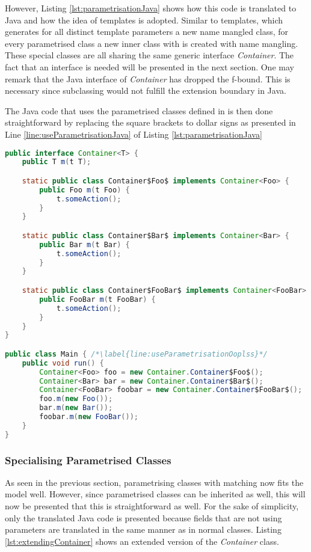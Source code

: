 However, Listing \ref{lst:parametrisationJava} shows
how this code is translated to Java and how the idea of templates is
adopted. Similar to \cpp templates, which generates for all distinct
template parameters a new name mangled class, for every parametrised
class a new inner class with is created with name mangling.
These special classes are all sharing the same generic
interface \emph{Container}. The fact that an interface is needed will be
presented in the next section. One may remark that the Java interface
of \emph{Container} has dropped the f-bound. This is necessary since
subclassing would not fulfill the extension boundary in Java.

The Java code that uses the parametrised classes defined in \ooplss is
then done straightforward by replacing the square brackets to dollar
signs as presented in Line \ref{line:useParametrisationJava} of Listing
\ref{lst:parametrisationJava}

\begin{lstlisting}[language=java,caption=Container class translated to Java,label=lst:parametrisationJava]
public interface Container<T> {
	public T m(t T);

	static public class Container$Foo$ implements Container<Foo> {
		public Foo m(t Foo) {
			t.someAction();
		}
	}

	static public class Container$Bar$ implements Container<Bar> {
		public Bar m(t Bar) {
			t.someAction();
		}
	}

	static public class Container$FooBar$ implements Container<FooBar> {
		public FooBar m(t FooBar) {
			t.someAction();
		}
	}
}

public class Main { /*\label{line:useParametrisationOoplss}*/
	public void run() {
		Container<Foo> foo = new Container.Container$Foo$();
		Container<Bar> bar = new Container.Container$Bar$();
		Container<FooBar> foobar = new Container.Container$FooBar$();
		foo.m(new Foo());
		bar.m(new Bar());
		foobar.m(new FooBar());
	}
}
\end{lstlisting}

\subsubsection{Specialising Parametrised Classes}
As seen in the previous section, parametrising classes with matching
now fits the model well. However, since parametrised classes
can be inherited as well, this will now be presented that this
is straightforward as well. For the sake of simplicity, only the
translated Java code is presented because fields that are not using
parameters are translated in the same manner as in normal classes.
Listing \ref{lst:extendingContainer} shows an extended version of the
\emph{Container} class.

